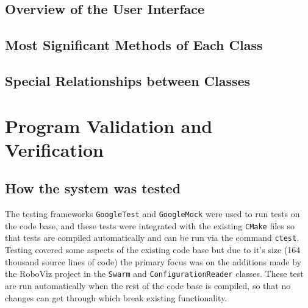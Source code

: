 \documentclass[11pt,a4paper]{article}
\begin{document}
\subsection{Overview of the User Interface}
\subsection{Most Significant Methods of Each Class}
\subsection{Special Relationships between Classes}

\section{Program Validation and Verification}
\label{s:progr-valid-verif}
%
%
%

\subsection{How the system was tested}
The testing frameworks \texttt{GoogleTest} and \texttt{GoogleMock} were
used to run tests on the code base, and these tests were integrated with the
existing \texttt{CMake} files so that tests are compiled automatically and can
be run via the command \texttt{ctest}. Testing covered some aspects of the
existing code base but due to it's size (164 thousand source lines of code)
the primary focus was on the additions made by the RoboViz project in the
\texttt{Swarm} and \texttt{ConfigurationReader} classes. These test are run
automatically when the rest of the code base is compiled, so that no changes
can get through which break existing functionality.
\end{document}
